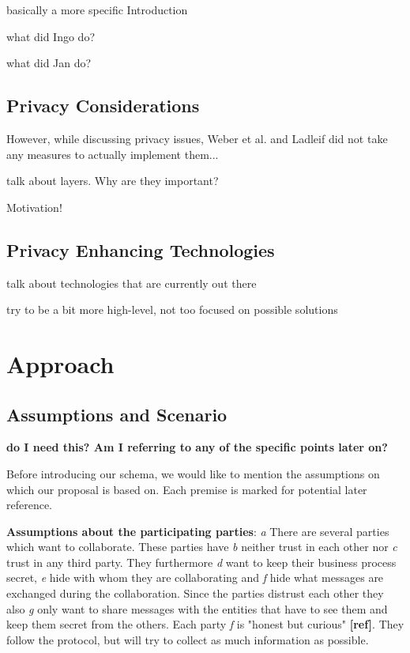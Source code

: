 \documentclass[runningheads]{llncs}
\newcommand{\ber}[1]{\textit{#1}}
\begin{document}
basically a more specific Introduction

what did Ingo do?

what did Jan do? 

\subsection{Privacy Considerations} \label{subsec:privacy}

However, while discussing privacy issues, Weber et al. and Ladleif did not take any measures to actually implement them...

talk about layers. Why are they important? 

Motivation!

\subsection{Privacy Enhancing Technologies} \label{subsec:technologies}

talk about technologies that are currently out there 

try to be a bit more high-level, not too focused on possible solutions




\section{Approach} \label{sec:approach}

\subsection{Assumptions and Scenario} \label{subsec:assumptions}

\textbf{do I need this? Am I referring to any of the specific points later on?}



Before introducing our schema, we would like to mention the assumptions on which our proposal is based on. Each premise is marked for potential later reference.


\bigbreak
\textbf{Assumptions about the participating parties}: \ber{a} There are several parties which want to collaborate. These parties have \ber{b} neither trust in each other nor \ber{c} trust in any third party. They furthermore \ber{d} want to keep their business process secret, \ber{e} hide with whom they are collaborating and \ber{f} hide what messages are exchanged during the collaboration. Since the parties distrust each other they also \ber{g} only want to share messages with the entities that have to see them and keep them secret from the others. Each party \ber{f} is "honest but curious" \textbf{[ref]}. They follow the protocol, but will try to collect as much information as possible. 
\end{document}
